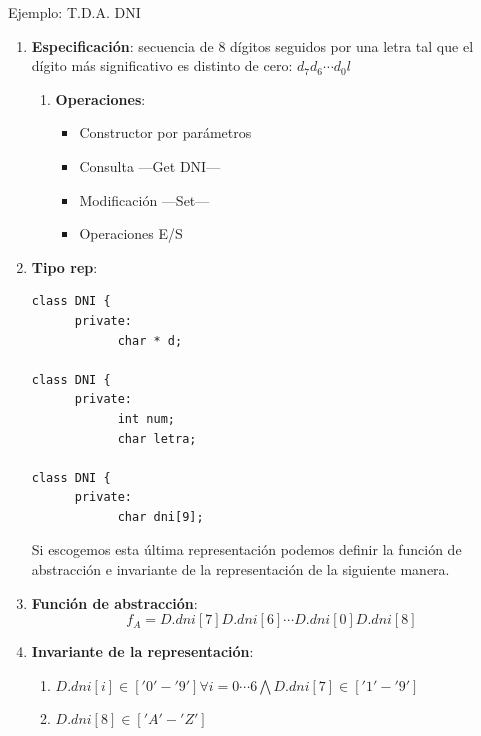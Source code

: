 \documentclass[10pt,a4paper,spanish]{report}
\begin{document}
\noindent
Ejemplo: T.D.A. DNI
\begin{enumerate}[$\heartsuit$]
\item \textbf{\textcolor[rgb]{0.8,0.2,0.2}{Especificación}}: secuencia de 8 dígitos seguidos por una letra tal que el dígito más significativo es distinto de cero: $d_{7}d_{6}\cdots d_{0}l$
\begin{enumerate}[$\spadesuit$]
\item \textbf{\textcolor[rgb]{0.8,0.2,0.2}{Operaciones}}:
\begin{itemize}
\item Constructor por parámetros
\item Consulta ---Get DNI---
\item Modificación ---Set---
\item Operaciones E/S
\end{itemize}
\end{enumerate}
\item \textbf{\textcolor[rgb]{0.8,0.2,0.2}{Tipo rep}}:
\begin{verbatim}
class DNI {
      private:
            char * d;

class DNI {
      private:
            int num;
            char letra;

class DNI {
      private:
            char dni[9];
\end{verbatim}
Si escogemos esta última representación podemos definir la función de abstracción e invariante de la representación
de la siguiente manera.
\item \textbf{\textcolor[rgb]{0.8,0.2,0.2}{Función de abstracción}}:
\begin{displaymath}
f_{A} = D.dni[7] D.dni[6] \cdots D.dni[0] D.dni[8]
\end{displaymath}

\item \textbf{\textcolor[rgb]{0.8,0.2,0.2}{Invariante de la representación}}:
\begin{enumerate}[$\spadesuit$]
\item $D.dni[i] \in ['0'-'9'] \forall i=0 \cdots 6 \bigwedge D.dni[7] \in ['1'-'9']$
\item $D.dni[8] \in ['A'-'Z']$
\end{enumerate}
\end{enumerate}
\end{document}
